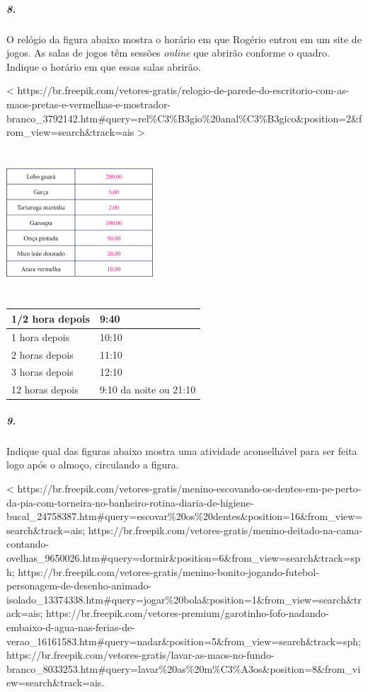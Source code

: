 \subparagraph{8.}\label{section-49}

O relógio da figura abaixo mostra o horário em que Rogério entrou em um
site de jogos. As salas de jogos têm sessões \emph{online} que abrirão
conforme o quadro. Indique o horário em que essas salas abrirão.

\textless{}
https://br.freepik.com/vetores-gratis/relogio-de-parede-do-escritorio-com-as-maos-pretas-e-vermelhas-e-mostrador-branco\_3792142.htm\#query=rel\%C3\%B3gio\%20anal\%C3\%B3gico\&position=2\&from\_view=search\&track=ais
\textgreater{}

\includegraphics[width=2.15625in,height=2.15625in]{media/image63.png}

\begin{longtable}[]{@{}ll@{}}
\toprule
1/2 hora depois & 9:40\tabularnewline
\midrule
\endhead
1 hora depois & 10:10\tabularnewline
2 horas depois & 11:10\tabularnewline
3 horas depois & 12:10\tabularnewline
12 horas depois & 9:10 da noite ou 21:10\tabularnewline
\bottomrule
\end{longtable}

\subparagraph{9.}\label{section-50}

Indique qual das figuras abaixo mostra uma atividade aconselhável para
ser feita logo após o almoço, circulando a figura.

\textless{}
https://br.freepik.com/vetores-gratis/menino-escovando-os-dentes-em-pe-perto-da-pia-com-torneira-no-banheiro-rotina-diaria-de-higiene-bucal\_24758387.htm\#query=escovar\%20os\%20dentes\&position=16\&from\_view=search\&track=ais;
https://br.freepik.com/vetores-gratis/menino-deitado-na-cama-contando-ovelhas\_9650026.htm\#query=dormir\&position=6\&from\_view=search\&track=sph;
https://br.freepik.com/vetores-gratis/menino-bonito-jogando-futebol-personagem-de-desenho-animado-isolado\_13374338.htm\#query=jogar\%20bola\&position=1\&from\_view=search\&track=ais;
https://br.freepik.com/vetores-premium/garotinho-fofo-nadando-embaixo-d-agua-nas-ferias-de-verao\_16161583.htm\#query=nadar\&position=5\&from\_view=search\&track=sph;
https://br.freepik.com/vetores-gratis/lavar-as-maos-no-fundo-branco\_8033253.htm\#query=lavar\%20as\%20m\%C3\%A3os\&position=8\&from\_view=search\&track=ais.

